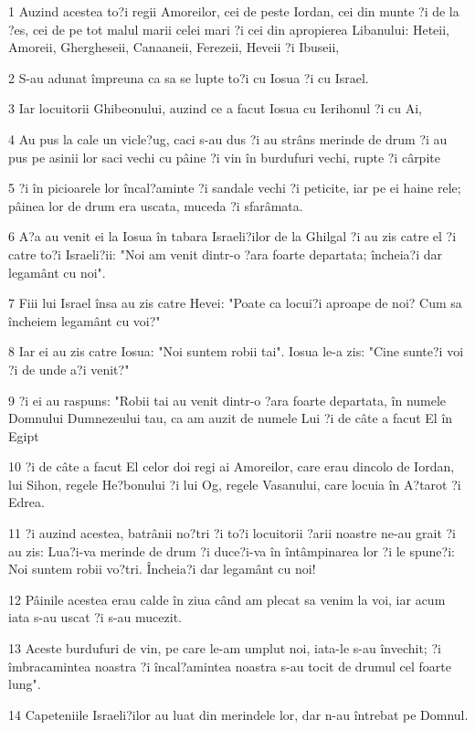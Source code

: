 \par 1 Auzind acestea to?i regii Amoreilor, cei de peste Iordan, cei din munte ?i de la ?es, cei de pe tot malul marii celei mari ?i cei din apropierea Libanului: Heteii, Amoreii, Ghergheseii, Canaaneii, Ferezeii, Heveii ?i Ibuseii,
\par 2 S-au adunat împreuna ca sa se lupte to?i cu Iosua ?i cu Israel.
\par 3 Iar locuitorii Ghibeonului, auzind ce a facut Iosua cu Ierihonul ?i cu Ai,
\par 4 Au pus la cale un vicle?ug, caci s-au dus ?i au strâns merinde de drum ?i au pus pe asinii lor saci vechi cu pâine ?i vin în burdufuri vechi, rupte ?i cârpite
\par 5 ?i în picioarele lor încal?aminte ?i sandale vechi ?i peticite, iar pe ei haine rele; pâinea lor de drum era uscata, muceda ?i sfarâmata.
\par 6 A?a au venit ei la Iosua în tabara Israeli?ilor de la Ghilgal ?i au zis catre el ?i catre to?i Israeli?ii: "Noi am venit dintr-o ?ara foarte departata; încheia?i dar legamânt cu noi".
\par 7 Fiii lui Israel însa au zis catre Hevei: "Poate ca locui?i aproape de noi? Cum sa încheiem legamânt cu voi?"
\par 8 Iar ei au zis catre Iosua: "Noi suntem robii tai". Iosua le-a zis: "Cine sunte?i voi ?i de unde a?i venit?"
\par 9 ?i ei au raspuns: "Robii tai au venit dintr-o ?ara foarte departata, în numele Domnului Dumnezeului tau, ca am auzit de numele Lui ?i de câte a facut El în Egipt
\par 10 ?i de câte a facut El celor doi regi ai Amoreilor, care erau dincolo de Iordan, lui Sihon, regele He?bonului ?i lui Og, regele Vasanului, care locuia în A?tarot ?i Edrea.
\par 11 ?i auzind acestea, batrânii no?tri ?i to?i locuitorii ?arii noastre ne-au grait ?i au zis: Lua?i-va merinde de drum ?i duce?i-va în întâmpinarea lor ?i le spune?i: Noi suntem robii vo?tri. Încheia?i dar legamânt cu noi!
\par 12 Pâinile acestea erau calde în ziua când am plecat sa venim la voi, iar acum iata s-au uscat ?i s-au mucezit.
\par 13 Aceste burdufuri de vin, pe care le-am umplut noi, iata-le s-au învechit; ?i îmbracamintea noastra ?i încal?amintea noastra s-au tocit de drumul cel foarte lung".
\par 14 Capeteniile Israeli?ilor au luat din merindele lor, dar n-au întrebat pe Domnul.
